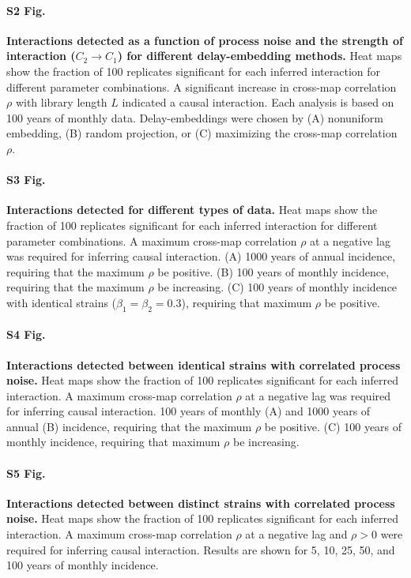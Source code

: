 \documentclass[10pt,letterpaper]{article}
\begin{document}
\paragraph*{S2 Fig.}
\label{fig:detect_diffembed}
{\bf Interactions detected as a function of process noise and the strength of interaction ($C_2 \rightarrow C_1$) for different delay-embedding methods.}
Heat maps show the fraction of 100 replicates significant for each inferred interaction for different parameter combinations.
A significant increase in cross-map correlation $\rho$ with library length $L$ indicated a causal interaction.
Each analysis is based on 100 years of monthly data.
Delay-embeddings were chosen by (A) nonuniform embedding, (B) random projection, or (C) maximizing the cross-map correlation $\rho$.

\paragraph*{S3 Fig.}
\label{fig:detect_diffdata_lag}
{\bf Interactions detected for different types of data.}
Heat maps show the fraction of 100 replicates significant for each inferred interaction for different parameter combinations.
A maximum cross-map correlation $\rho$ at a negative lag was required for inferring causal interaction.
(A) 1000 years of annual incidence, requiring that the maximum $\rho$ be positive.
(B) 100 years of monthly incidence, requiring that the maximum $\rho$ be increasing.
(C) 100 years of monthly incidence with identical strains ($\beta_1=\beta_2=0.3$), requiring that maximum $\rho$ be positive.

\paragraph*{S4 Fig.}
\label{fig:detect_corrproc_identical}
{\bf Interactions detected between identical strains with correlated process noise.}
Heat maps show the fraction of 100 replicates significant for each inferred interaction.
A maximum cross-map correlation $\rho$ at a negative lag was required for inferring causal interaction.
100 years of monthly (A) and 1000 years of annual (B) incidence, requiring that the maximum $\rho$ be positive.
(C) 100 years of monthly incidence, requiring that maximum $\rho$ be increasing.

\paragraph*{S5 Fig.}
\label{fig:detect_corrproc_distinct}
{\bf Interactions detected between distinct strains with correlated process noise.}
Heat maps show the fraction of 100 replicates significant for each inferred interaction.
A maximum cross-map correlation $\rho$ at a negative lag and $\rho>0$ were required for inferring causal interaction.
Results are shown for 5, 10, 25, 50, and 100 years of monthly incidence.
\end{document}
